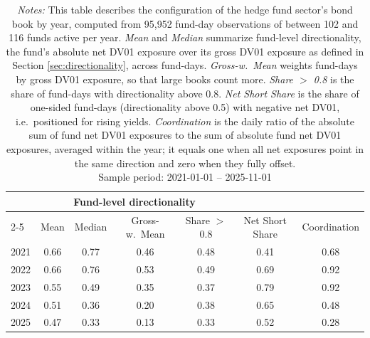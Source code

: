 \documentclass[english, 11pt, oneside]{article}
\begin{document}
\begin{table}[t]
\centering
\caption{\textbf{The Hedge Fund Sector's Book by Year}}
\footnotesize
\setlength{\tabcolsep}{6pt}
\renewcommand{\arraystretch}{1.1}
\begin{tabular}{l c c c c c c}
\toprule
 & \multicolumn{4}{c}{Fund-level directionality} & & \\
\cmidrule(lr){2-5}
 & Mean & Median & Gross-w.\ Mean & Share $>$ 0.8 & Net Short Share & Coordination \\
\midrule
2021 & 0.66 & 0.77 & 0.46 & 0.48 & 0.41 & 0.68 \\
2022 & 0.66 & 0.76 & 0.53 & 0.49 & 0.69 & 0.92 \\
2023 & 0.55 & 0.49 & 0.35 & 0.37 & 0.79 & 0.92 \\
2024 & 0.51 & 0.36 & 0.20 & 0.38 & 0.65 & 0.48 \\
2025 & 0.47 & 0.33 & 0.13 & 0.33 & 0.52 & 0.28 \\
\bottomrule
\end{tabular}
\label{tab:fund_dir}
\caption*{\textit{Notes:} This table describes the configuration of the hedge fund sector's bond book by year, computed from 95,952 fund-day observations of between 102 and 116 funds active per year. \textit{Mean} and \textit{Median} summarize fund-level directionality, the fund's absolute net DV01 exposure over its gross DV01 exposure as defined in Section \ref{sec:directionality}, across fund-days. \textit{Gross-w.\ Mean} weights fund-days by gross DV01 exposure, so that large books count more. \textit{Share $>$ 0.8} is the share of fund-days with directionality above 0.8. \textit{Net Short Share} is the share of one-sided fund-days (directionality above 0.5) with negative net DV01, i.e.\ positioned for rising yields. \textit{Coordination} is the daily ratio of the absolute sum of fund net DV01 exposures to the sum of absolute fund net DV01 exposures, averaged within the year; it equals one when all net exposures point in the same direction and zero when they fully offset. \\ Sample period: 2021-01-01 -- 2025-11-01}
\end{table}
\end{document}
